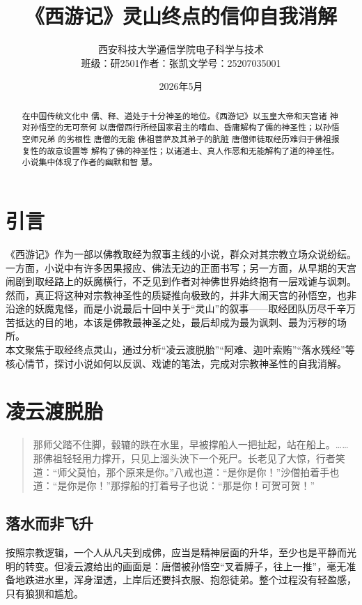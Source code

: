 \documentclass{ctexart}
\title{《西游记》灵山终点的信仰自我消解}
\author{西安科技大学\hspace{1em}通信学院\hspace{1em}电子科学与技术 \\
班级：研2501\hspace{1cm}作者：张凯文\hspace{1cm}学号：25207035001}
\date{2026年5月}
\begin{document}
\maketitle

\begin{abstract}
在中国传统文化中 儒、释、道处于十分神圣的地位。《西游记》以玉皇大帝和天宫诸
神对孙悟空的无可奈何 以唐僧西行所经国家君主的嗜血、昏庸解构了儒的神圣性；以孙悟空师兄弟
的劣根性 唐僧的无能 佛祖菩萨及其弟子的肮脏 唐僧师徒取经历难归于佛祖报复性的故意设置等
解构了佛的神圣性；以诸道士、真人作恶和无能解构了道的神圣性。小说集中体现了作者的幽默和智
慧。 \\
\end{abstract}

\section{引言}
《西游记》作为一部以佛教取经为叙事主线的小说，群众对其宗教立场众说纷纭。一方面，小说中有许多因果报应、佛法无边的正面书写；另一方面，从早期的天宫闹剧到取经路上的妖魔横行，不乏见到作者对神佛世界始终抱有一层戏谑与讽刺。然而，真正将这种对宗教神圣性的质疑推向极致的，并非大闹天宫的孙悟空，也非沿途的妖魔鬼怪，而是小说最后十回中关于“灵山”的叙事——取经团队历尽千辛万苦抵达的目的地，本该是佛教最神圣之处，最后却成为最为讽刺、最为污秽的场所。 \\

本文聚焦于取经终点灵山，通过分析“凌云渡脱胎”“阿难、迦叶索贿”“落水残经”等核心情节，探讨小说如何以反讽、戏谑的笔法，完成对宗教神圣性的自我消解。

\section{凌云渡脱胎}
\begin{quotation}
那师父踏不住脚，毂辘的跌在水里，早被撑船人一把扯起，站在船上。……那佛祖轻轻用力撑开，只见上溜头泱下一个死尸。长老见了大惊，行者笑道：“师父莫怕，那个原来是你。”八戒也道：“是你是你！”沙僧拍着手也道：“是你是你！”那撑船的打着号子也说：“那是你！可贺可贺！”
\end{quotation}
\subsection{落水而非飞升}

按照宗教逻辑，一个人从凡夫到成佛，应当是精神层面的升华，至少也是平静而光明的转变。但凌云渡给出的画面是：唐僧被孙悟空“叉着膊子，往上一推”，毫无准备地跌进水里，浑身湿透，上岸后还要抖衣服、抱怨徒弟。整个过程没有轻盈感，只有狼狈和尴尬。
\end{document}
